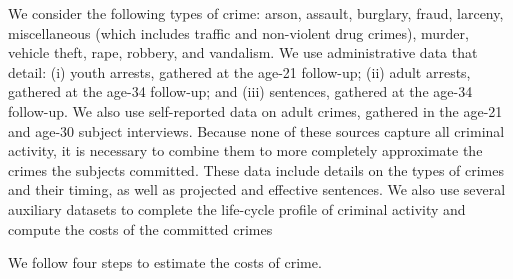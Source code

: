 We consider the following types of crime: arson, assault, burglary, fraud, larceny, miscellaneous (which includes traffic and non-violent drug crimes), murder, vehicle theft, rape, robbery, and vandalism. We use administrative data that detail: (i) youth arrests, gathered at the age-21 follow-up; (ii) adult arrests, gathered at the age-34 follow-up; and (iii) sentences, gathered at the age-34 follow-up. We also use self-reported data on adult crimes, gathered in the age-21 and age-30 subject interviews. Because none of these sources capture all criminal activity, it is necessary to combine them to more completely approximate the crimes the subjects committed. These data include details on the types of crimes and their timing, as well as projected and effective sentences. We also use several auxiliary datasets to complete the life-cycle profile of criminal activity and compute the costs of the committed crimes

We follow four steps to estimate the costs of crime. 

